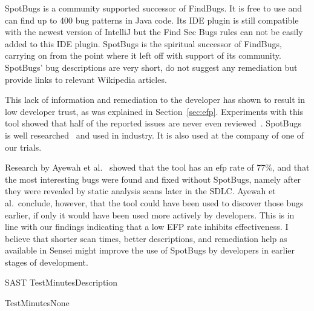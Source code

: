 {
\label{bc:SpotBugs}
SpotBugs is a community supported successor of FindBugs.
It is free to use and can find up to 400 bug patterns in Java code.
Its IDE plugin is still compatible with the newest version of IntelliJ but the Find Sec Bugs rules can not be easily added to this IDE plugin.
SpotBugs is the spiritual successor of FindBugs, carrying on from the point where it left off with support of its community.
SpotBugs' bug descriptions are very short, do not suggest any remediation but provide links to relevant Wikipedia articles. 

This lack of information and remediation to the developer has shown to result in low developer trust, as was explained in Section~\ref{sec:efp}.
Experiments with this tool showed that half of the reported issues are never even reviewed~\cite{ayewah2007using}.
SpotBugs is well researched~\cite{ayewah2007using,ayewah2010google,findbugs2008} and used in industry.
It is also used at the company of one of our trials.

Research by Ayewah et al.~\cite{ayewah2007using} showed that the tool has an \gls{efp} rate of 77\%, and that the most interesting bugs were found and fixed without SpotBugs, namely after they were revealed by static analysis scans later in the SDLC. Ayewah et al.\ conclude, however, that the tool could have been used to discover those bugs earlier, if only it would have been used more actively by developers. This is in line with our findings indicating that a low EFP rate inhibits effectiveness. I believe that shorter scan times, better descriptions, and remediation help as available in Sensei might improve the use of SpotBugs by developers in earlier stages of development.
}{SAST}
{Test}{Minutes}{Description}

{Test}{Minutes}{None}

